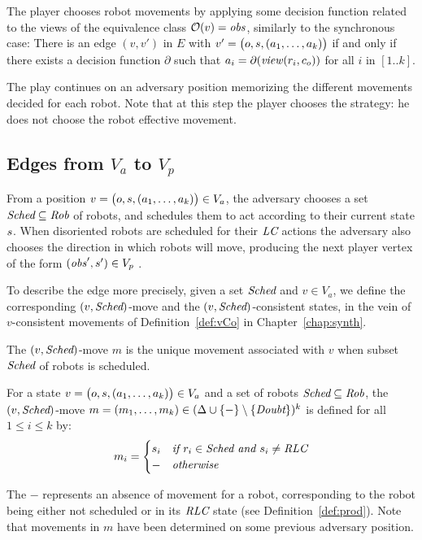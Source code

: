 The player chooses robot movements by applying some decision function related to the views of the 
equivalence class $\mathcal{O}(v)=\mathit{obs}$, similarly to the synchronous case:  
There is an edge $(v, v')$ in $E$ with $v'=\bigl (o, s, (a_1, \dots, a_k)\bigr )$ if and only if there exists 
a decision function $\partial$ such that $a_i=\partial(\mathit{view}(r_i, c_o))$ for all $i$ in  $[1.. k]$.  

The play continues on an adversary position memorizing the different movements
decided for each robot.
Note that at this step the player chooses the strategy: he does not choose the robot effective movement.


\subsection{Edges from $V_a$ to $V_p$}
From a position $v= \bigl (o, s, (a_1, \dots, a_k)\bigr ) \in V_a$, the adversary 
chooses a set $\textit{Sched} \subseteq \textit{Rob}$ of robots, and schedules them to act according to their 
current state $s$.
When disoriented robots are scheduled for their $\textit{LC}$ actions the adversary also 
chooses the direction in which robots will move, producing  
the next player vertex of the form $(\mathit{obs}', s' ) \in V_p$ .

To  describe the edge more precisely, given a set $\textit{Sched}$ and $v \in V_a$, we define the 
corresponding $(v, \textit{Sched})$-move and the $(v, \textit{Sched})$-consistent states, in the vein of $v$-consistent 
movements of Definition~\ref{def:vCo} in Chapter~\ref{chap:synth}.

The $(v, \textit{Sched})$-move $m$ is the unique movement associated 
 with $v$ when subset $\textit{Sched}$ of robots is scheduled. 
 \begin{definition}\label{def:mCo}
 For a state $v= \bigl (o, s, (a_1, \dots, a_k)\bigr ) \in V_a$ and a set of robots
 $\textit{Sched} \subseteq \textit{Rob}$,  the $(v, \textit{Sched})$-move 
 $m = (m_1, \dots, m_k)\in(\Delta \cup   \{-\} \setminus \{\textit{Doubt}\})^k$ is defined
for all $1 \leq i \leq k$ by: \\ $$m_i= \begin{cases}
 s_i & \textit{if } r_i \in \textit{Sched} \textit{ and } s_i \neq \textit{RLC} \\
 - &\textit{otherwise}
 \end{cases}$$
 \end{definition}
The $-$ represents an absence of movement for a robot, corresponding to the robot 
 being either not scheduled or in its $\textit{RLC}$ state (see Definition~\ref{def:prod}).
 Note that movements in $m$ have been determined on some previous adversary position.

